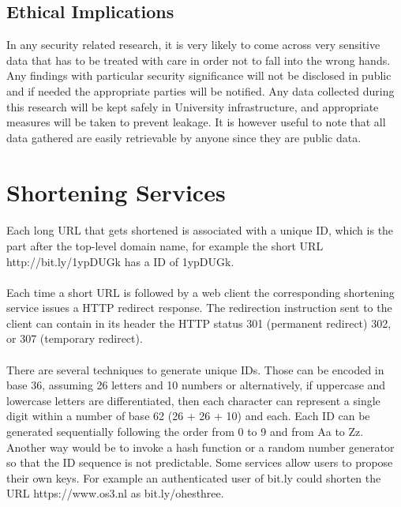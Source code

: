 \documentclass[12pt]{article}
\begin{document}
\subsection{Ethical Implications}
In any security related research, it is very likely to come across very sensitive data that has to be treated with care in order not to fall into the wrong hands. Any findings with particular security significance will not be disclosed in public and if needed the appropriate parties will be notified. Any data collected during this research will be kept safely in University infrastructure, and appropriate measures will be taken to prevent leakage. It is however useful to note that all data gathered are easily retrievable by anyone since they are public data.
\newpage
\section{Shortening Services}
\paragraph{}
Each long URL that gets shortened is associated with a unique ID, which is the part after the top-level domain name, for example the short URL http://bit.ly/1ypDUGk has a ID of 1ypDUGk. 
\paragraph{}
Each time a short URL is followed by a web client the corresponding shortening service issues a HTTP redirect response. The redirection instruction sent to the client can contain in its header the HTTP status 301 (permanent redirect) 302, or 307 (temporary redirect).

\paragraph{}
There are several techniques to generate unique IDs. Those can be encoded in base 36, assuming 26 letters and 10 numbers or alternatively, if uppercase and lowercase letters are differentiated, then each character can represent a single digit within a number of base 62 (26 + 26 + 10) and each. Each ID can be generated sequentially following the order from 0 to 9 and from Aa to Zz. Another way would be to invoke a hash function or a random number generator so that the ID sequence is not predictable. Some services allow users to propose their own keys. For example an authenticated user of bit.ly could shorten the URL https://www.os3.nl as bit.ly/ohesthree. 
\end{document}
